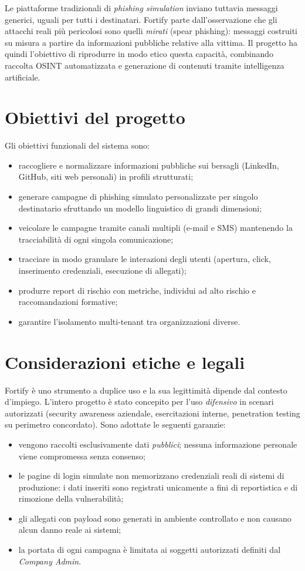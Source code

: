 \documentclass[12pt,a4paper,oneside]{report}
\begin{document}
Le piattaforme tradizionali di \emph{phishing simulation} inviano tuttavia messaggi
generici, uguali per tutti i destinatari. Fortify parte dall'osservazione che gli attacchi
reali pi\`u pericolosi sono quelli \emph{mirati} (spear phishing): messaggi costruiti su
misura a partire da informazioni pubbliche relative alla vittima. Il progetto ha quindi
l'obiettivo di riprodurre in modo etico questa capacit\`a, combinando raccolta OSINT
automatizzata e generazione di contenuti tramite intelligenza artificiale.

\section{Obiettivi del progetto}
Gli obiettivi funzionali del sistema sono:
\begin{itemize}[nosep]
  \item raccogliere e normalizzare informazioni pubbliche sui bersagli (LinkedIn, GitHub,
        siti web personali) in profili strutturati;
  \item generare campagne di phishing simulato personalizzate per singolo destinatario
        sfruttando un modello linguistico di grandi dimensioni;
  \item veicolare le campagne tramite canali multipli (e-mail e SMS) mantenendo la
        tracciabilit\`a di ogni singola comunicazione;
  \item tracciare in modo granulare le interazioni degli utenti (apertura, click,
        inserimento credenziali, esecuzione di allegati);
  \item produrre report di rischio con metriche, individui ad alto rischio e
        raccomandazioni formative;
  \item garantire l'isolamento multi-tenant tra organizzazioni diverse.
\end{itemize}

\section{Considerazioni etiche e legali}
Fortify \`e uno strumento a duplice uso e la sua legittimit\`a dipende dal contesto d'impiego.
L'intero progetto \`e stato concepito per l'uso \emph{difensivo} in scenari autorizzati
(security awareness aziendale, esercitazioni interne, penetration testing su perimetro
concordato). Sono adottate le seguenti garanzie:
\begin{itemize}[nosep]
  \item vengono raccolti esclusivamente dati \emph{pubblici}; nessuna informazione personale
        viene compromessa senza consenso;
  \item le pagine di login simulate non memorizzano credenziali reali di sistemi di
        produzione: i dati inseriti sono registrati unicamente a fini di reportistica e
        di rimozione della vulnerabilit\`a;
  \item gli allegati con payload sono generati in ambiente controllato e non causano alcun
        danno reale ai sistemi;
  \item la portata di ogni campagna \`e limitata ai soggetti autorizzati definiti dal
        \emph{Company Admin}.
\end{itemize}
\end{document}
